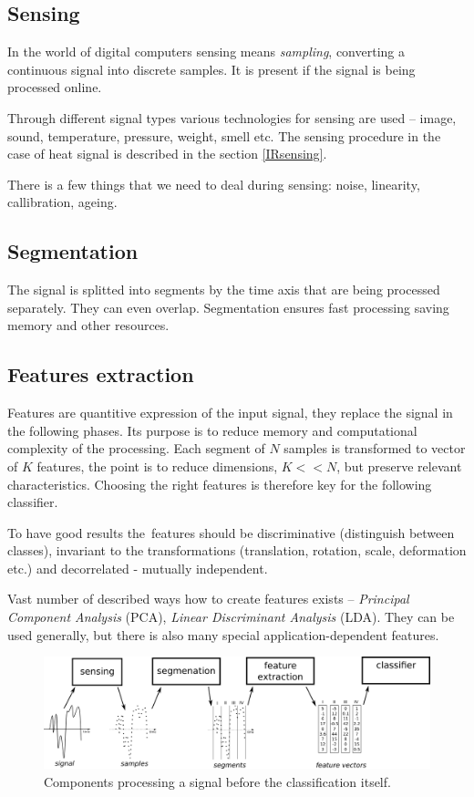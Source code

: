 \subsection*{Sensing}
In the world of digital computers sensing means {\it sampling}, converting a continuous signal
into discrete samples. It is present if the signal is being processed online.

Through different signal types various technologies for sensing are used -- image, sound, temperature,
pressure, weight, smell etc. The sensing procedure in the case of heat signal is described in the section
\ref{IRsensing}.

There is a few things that we need to deal during sensing: noise, linearity, callibration, ageing.

\subsection*{Segmentation}
The signal is splitted into segments by the time axis that are being processed separately. They can even overlap.
Segmentation ensures fast processing saving memory and other resources.

\subsection*{Features extraction}
Features are quantitive expression of the input signal, they replace the signal in the following phases.
Its purpose is to reduce memory and computational complexity of the processing. Each segment of $N$ samples
is transformed to vector of $K$ features, the point is to reduce dimensions, $K << N$, but preserve
relevant characteristics. Choosing the right features is therefore key for the following classifier.

To have good results the~features should be discriminative (distinguish between classes), invariant to
the transformations (translation, rotation, scale, deformation etc.) and decorrelated - mutually independent.

Vast number of described ways how to create features exists -- {\it Principal Component Analysis} (PCA),
{\it Linear Discriminant Analysis} (LDA). They can be used generally, but there is also many special
application-dependent features. 

\begin{figure}[h!]
\begin{center}
\includegraphics[width=1\textwidth]{obrazky-figures/featureextraction.png}
\caption{Components processing a signal before the classification itself.\label{fig:featureextraction}}
\end{center}
\end{figure}

